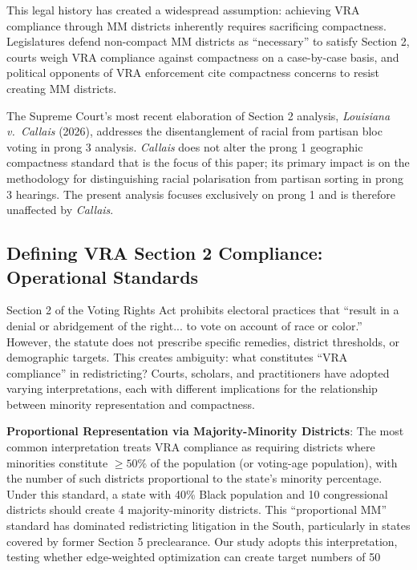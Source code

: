 This legal history has created a widespread assumption: achieving VRA compliance through MM districts inherently requires sacrificing compactness. Legislatures defend non-compact MM districts as ``necessary'' to satisfy Section 2, courts weigh VRA compliance against compactness on a case-by-case basis, and political opponents of VRA enforcement cite compactness concerns to resist creating MM districts.

The Supreme Court's most recent elaboration of Section 2 analysis, \emph{Louisiana v.\ Callais} (2026), addresses the disentanglement of racial from partisan bloc voting in prong 3 analysis. \emph{Callais} does not alter the prong 1 geographic compactness standard that is the focus of this paper; its primary impact is on the methodology for distinguishing racial polarisation from partisan sorting in prong 3 hearings. The present analysis focuses exclusively on prong 1 and is therefore unaffected by \emph{Callais}.

\subsection{Defining VRA Section 2 Compliance: Operational Standards}

Section 2 of the Voting Rights Act prohibits electoral practices that ``result in a denial or abridgement of the right... to vote on account of race or color.'' However, the statute does not prescribe specific remedies, district thresholds, or demographic targets. This creates ambiguity: what constitutes ``VRA compliance'' in redistricting? Courts, scholars, and practitioners have adopted varying interpretations, each with different implications for the relationship between minority representation and compactness.

\textbf{Proportional Representation via Majority-Minority Districts}: The most common interpretation treats VRA compliance as requiring districts where minorities constitute $\geq 50\%$ of the population (or voting-age population), with the number of such districts proportional to the state's minority percentage. Under this standard, a state with 40\% Black population and 10 congressional districts should create 4 majority-minority districts. This ``proportional MM'' standard has dominated redistricting litigation in the South, particularly in states covered by former Section 5 preclearance. Our study adopts this interpretation, testing whether edge-weighted optimization can create target numbers of 50%

